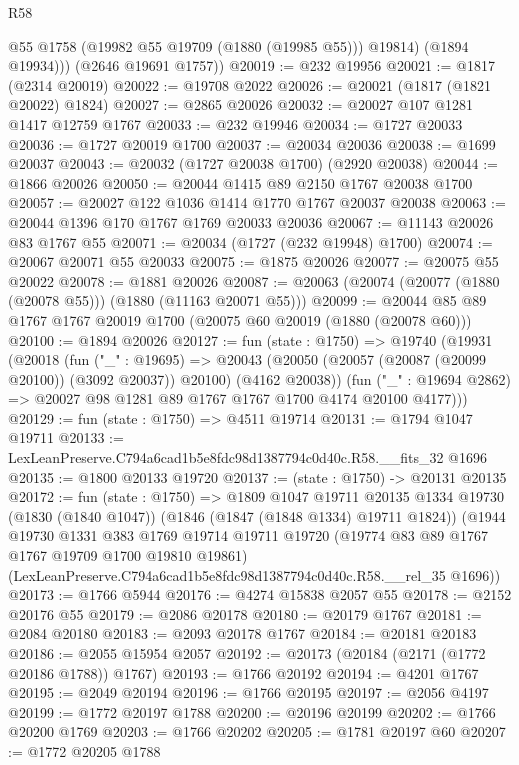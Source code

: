 \begin{lexlean}{R58}
\begin{coremodule}
            @55
            @1758
            (@19982 @55 @19709 (@1880 (@19985 @55)))
            @19814)
          (@1894 @19934)))
      (@2646 @19691 @1757))
@20019 := @232 @19956
@20021 := @1817 (@2314 @20019)
@20022 := @19708 @2022
@20026 := @20021 (@1817 (@1821 @20022) @1824)
@20027 := @2865 @20026
@20032 := @20027 @107 @1281 @1417 @12759 @1767
@20033 := @232 @19946
@20034 := @1727 @20033
@20036 := @1727 @20019 @1700
@20037 := @20034 @20036
@20038 := @1699 @20037
@20043 := @20032 (@1727 @20038 @1700) (@2920 @20038)
@20044 := @1866 @20026
@20050 := @20044 @1415 @89 @2150 @1767 @20038 @1700
@20057 := @20027 @122 @1036 @1414 @1770 @1767 @20037 @20038
@20063 := @20044 @1396 @170 @1767 @1769 @20033 @20036
@20067 := @11143 @20026 @83 @1767 @55
@20071 := @20034 (@1727 (@232 @19948) @1700)
@20074 := @20067 @20071 @55 @20033
@20075 := @1875 @20026
@20077 := @20075 @55 @20022
@20078 := @1881 @20026
@20087 := @20063 (@20074 (@20077 (@1880 (@20078 @55))) (@1880 (@11163 @20071 @55)))
@20099 := @20044 @85 @89 @1767 @1767 @20019 @1700 (@20075 @60 @20019 (@1880 (@20078 @60)))
@20100 := @1894 @20026
@20127 := fun (state : @1750) =>
  @19740
    (@19931
      (@20018
        (fun ("_" : @19695) =>
        @20043 (@20050 (@20057 (@20087 (@20099 @20100)) (@3092 @20037)) @20100) (@4162 @20038))
        (fun ("_" : @19694 @2862) => @20027 @98 @1281 @89 @1767 @1767 @1700 @4174 @20100 @4177)))
@20129 := fun (state : @1750) => @4511 @19714
@20131 := @1794 @1047 @19711
@20133 := LexLeanPreserve.C794a6cad1b5e8fdc98d1387794c0d40c.R58.__fits_32 @1696
@20135 := @1800 @20133 @19720
@20137 := (state : @1750) -> @20131 @20135
@20172 := fun (state : @1750) =>
  @1809
    @1047
    @19711
    @20135
    @1334
    @19730
    (@1830 (@1840 @1047))
    (@1846 (@1847 (@1848 @1334) @19711 @1824))
    (@1944
      @19730
      @1331
      @383
      @1769
      @19714
      @19711
      @19720
      (@19774 @83 @89 @1767 @1767 @19709 @1700 @19810 @19861)
      (LexLeanPreserve.C794a6cad1b5e8fdc98d1387794c0d40c.R58.__rel_35 @1696))
@20173 := @1766 @5944
@20176 := @4274 @15838 @2057 @55
@20178 := @2152 @20176 @55
@20179 := @2086 @20178
@20180 := @20179 @1767
@20181 := @2084 @20180
@20183 := @2093 @20178 @1767
@20184 := @20181 @20183
@20186 := @2055 @15954 @2057
@20192 := @20173 (@20184 (@2171 (@1772 @20186 @1788)) @1767)
@20193 := @1766 @20192
@20194 := @4201 @1767
@20195 := @2049 @20194
@20196 := @1766 @20195
@20197 := @2056 @4197
@20199 := @1772 @20197 @1788
@20200 := @20196 @20199
@20202 := @1766 @20200 @1769
@20203 := @1766 @20202
@20205 := @1781 @20197 @60
@20207 := @1772 @20205 @1788

\end{coremodule}
\end{lexlean}
